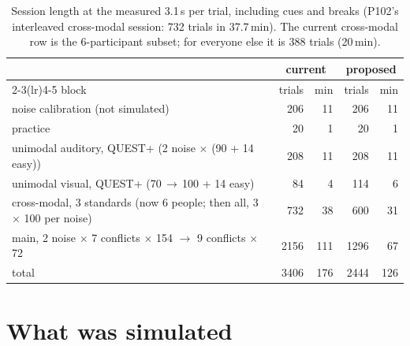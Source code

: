 \documentclass[11pt,a4paper]{article}
\begin{document}
\begin{table}[h]
\centering\small
\begin{tabular}{lrrrr}
\toprule
 & \multicolumn{2}{c}{current} & \multicolumn{2}{c}{proposed} \\
\cmidrule(lr){2-3}\cmidrule(lr){4-5}
block & trials & min & trials & min \\
\midrule
noise calibration (not simulated) & 206 & 11 & 206 & 11 \\
practice & 20 & 1 & 20 & 1 \\
unimodal auditory, QUEST+ (2 noise $\times$ (90 + 14 easy)) & 208 & 11 & 208 & 11 \\
unimodal visual, QUEST+ (70\,$\to$\,100 + 14 easy) & 84 & 4 & 114 & 6 \\
cross-modal, 3 standards (now 6 people; then all, 3 $\times$ 100 per noise) & 732 & 38 & 600 & 31 \\
main, 2 noise $\times$ 7 conflicts $\times$ 154 $\to$ 9 conflicts $\times$ 72 & 2156 & 111 & 1296 & 67 \\
\midrule
total & 3406 & 176 & 2444 & 126 \\
\bottomrule
\end{tabular}
\caption{Session length at the measured 3.1\,s per trial, including cues and breaks (P102's interleaved cross-modal session: 732 trials in 37.7\,min). The current cross-modal row is the 6-participant subset; for everyone else it is 388 trials (20\,min).}
\label{tab:plan}
\end{table}

\section{What was simulated}
\end{document}
